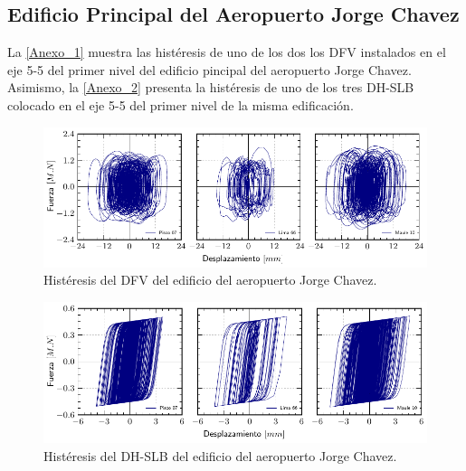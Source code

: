 \subsection*{Edificio Principal del Aeropuerto Jorge Chavez}
{}

La \autoref{Anexo_1} muestra las histéresis de uno de los dos los DFV instalados en el eje 5-5 del primer nivel del edificio pincipal del aeropuerto Jorge Chavez. Asimismo, la \autoref{Anexo_2} presenta la histéresis de uno de los tres DH-SLB colocado en el eje 5-5 del primer nivel de la misma edificación.


	\begin{figure}[!h]
	\centering
	\includegraphics[scale=1]{E_IMAGENES/3_Anexos/Anexo_1.pdf}
	\vspace{-8 mm}
	\caption[]{\centering\footnotesize Histéresis del DFV del edificio del aeropuerto Jorge Chavez.}
	\label{Anexo_1}
	\end{figure}	


	\begin{figure}[!h]
	\centering
	\includegraphics[scale=1]{E_IMAGENES/3_Anexos/Anexo_2.pdf}
	\vspace{-8 mm}
	\caption[]{\centering\footnotesize Histéresis del DH-SLB del edificio del aeropuerto Jorge Chavez.}
	\label{Anexo_2}
	\end{figure}	
